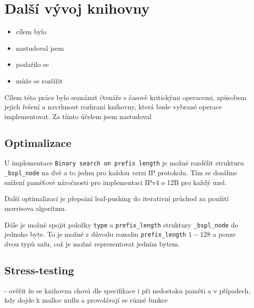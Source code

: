 \section{Další vývoj knihovny}

\begin{itemize}
	\item{cílem bylo}
	\item{nastudoval jsem}
	\item{podařilo se}
	\item{může se rozšířit}
\end{itemize}

Cílem této práce bylo seznámit čtenáře s časově kritickými operacemi, způsobem jejich řešení
a navrhnout rozhraní knihovny, která bude vybrané operace implementovat. Za tímto účelem
jsem nastudoval

\subsection{Optimalizace}
U implementace \texttt{Binary search on prefix length} je možné rozdělit strukturu \texttt{\_bspl\_node}
na dvě a to jednu pro každou verzi IP protokolu. Tím se dosáhne snížení paměťové náročnosti
pro implementaci IPv4 o 12B pro každý uzel.

Další optimalizací je přepsání leaf-pushing do iterativní průchod za použití morrisova algoritmu.

Dále je možné spojit položky \texttt{type} a \texttt{prefix\_length} struktury \texttt{\_bspl\_node}
do jednoho byte. To je možné z důvodu rozsahu \texttt{prefix\_length} $1-128$ a pouze dvou typů uzlu,
což je možné reprezentovat jedním bytem.

\subsection{Stress-testing}
- ověřit že se knihovna chová dle specifikace i při nedostaku paměti a v případech, kdy dojde k malloc nullu
a provolávají se různé funkce
